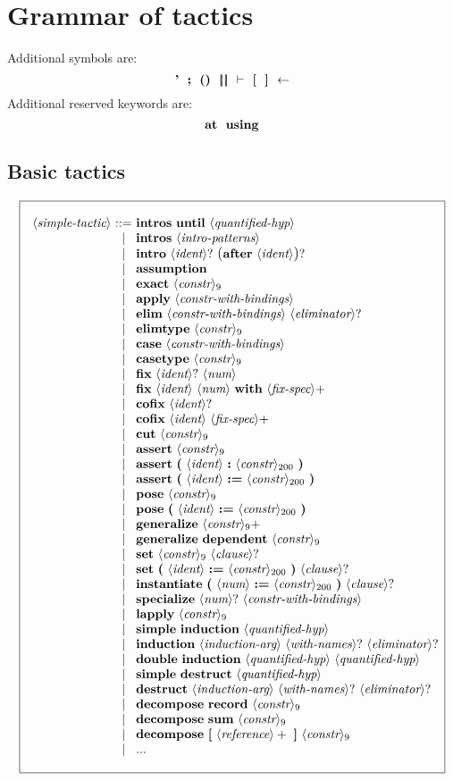 \documentclass{article}
\makeatletter
\def\bfbar{\ensuremath{|\hskip -0.22em{}|\hskip -0.24em{}|}}
\def\TERMbarbar{\bfbar\bfbar}
\def\GR#1{\text{\large(}#1\text{\large)}}
\def\NT#1{\langle\textit{#1}\rangle}
\def\NTL#1#2{\langle\textit{#1}\rangle_{#2}}
\def\TERM#1{{\bf\textrm{\bf #1}}}
\def\KWD#1{\TERM{#1}}
\def\PLUS#1{#1+}
\def\OPT#1{#1?}
\def\OPTGR#1{\GR{#1}?}
\newenvironment{cadre}
        {\begin{array}{|c|}\hline\\}
        {\\\\\hline\end{array}}
\newenvironment{rulebox}
        {$$\begin{cadre}\begin{array}{r@{~}c@{~}l@{}l@{}r}}
        {\end{array}\end{cadre}$$}
\def\DEFNT#1{\NT{#1} & ::= &}
\def\nlsep{\\&|&}
\newenvironment{rules}
        {\begin{center}\begin{rulebox}}
        {\end{rulebox}\end{center}}
\makeatother
\begin{document}

\section{Grammar of tactics}

\def\tacconstr{\NTL{constr}{9}}
\def\taclconstr{\NTL{constr}{200}}

Additional symbols are:
$$ \TERM{'}
~~ \KWD{;}
~~ \TERM{()}
~~ \TERMbarbar
~~ \TERM{$\vdash$}
~~ \TERM{[}
~~ \TERM{]}
~~ \TERM{$\leftarrow$}
$$
Additional reserved keywords are:
$$ \KWD{at}
~~ \TERM{using}
$$

\subsection{Basic tactics}

\begin{rules}
\DEFNT{simple-tactic}
       \TERM{intros}~\TERM{until}~\NT{quantified-hyp}
\nlsep \TERM{intros}~\NT{intro-patterns}
\nlsep \TERM{intro}~\OPT{\NT{ident}}~\OPTGR{\TERM{after}~\NT{ident}}
\nlsep \TERM{assumption}
\nlsep \TERM{exact}~\tacconstr
\nlsep \TERM{apply}~\NT{constr-with-bindings}
\nlsep \TERM{elim}~\NT{constr-with-bindings}~\OPT{\NT{eliminator}}
\nlsep \TERM{elimtype}~\tacconstr
\nlsep \TERM{case}~\NT{constr-with-bindings}
\nlsep \TERM{casetype}~\tacconstr
\nlsep \KWD{fix}~\OPT{\NT{ident}}~\NT{num}
\nlsep \KWD{fix}~\NT{ident}~\NT{num}~\KWD{with}~\PLUS{\NT{fix-spec}}
\nlsep \KWD{cofix}~\OPT{\NT{ident}}
\nlsep \KWD{cofix}~\NT{ident}~\PLUS{\NT{fix-spec}}
\nlsep \TERM{cut}~\tacconstr
\nlsep \TERM{assert}~\tacconstr
\nlsep \TERM{assert}~
  \TERM{(}~\NT{ident}~\KWD{:}~\taclconstr~\TERM{)}
\nlsep \TERM{assert}~
  \TERM{(}~\NT{ident}~\KWD{:=}~\taclconstr~\TERM{)}
\nlsep \TERM{pose}~\tacconstr
\nlsep \TERM{pose}~
  \TERM{(}~\NT{ident}~\KWD{:=}~\taclconstr~\TERM{)}
\nlsep \TERM{generalize}~\PLUS{\tacconstr}
\nlsep \TERM{generalize}~\TERM{dependent}~\tacconstr
\nlsep \TERM{set}~\tacconstr~\OPT{\NT{clause}}
\nlsep \TERM{set}~
  \TERM{(}~\NT{ident}~\KWD{:=}~\taclconstr~\TERM{)}~\OPT{\NT{clause}}
\nlsep \TERM{instantiate}~
  \TERM{(}~\NT{num}~\TERM{:=}~\taclconstr~\TERM{)}~\OPT{\NT{clause}}
\nlsep \TERM{specialize}~\OPT{\NT{num}}~\NT{constr-with-bindings}
\nlsep \TERM{lapply}~\tacconstr
\nlsep \TERM{simple}~\TERM{induction}~\NT{quantified-hyp}
\nlsep \TERM{induction}~\NT{induction-arg}~\OPT{\NT{with-names}}
       ~\OPT{\NT{eliminator}}
\nlsep \TERM{double}~\TERM{induction}~\NT{quantified-hyp}~\NT{quantified-hyp}
\nlsep \TERM{simple}~\TERM{destruct}~\NT{quantified-hyp}
\nlsep \TERM{destruct}~\NT{induction-arg}~\OPT{\NT{with-names}}
       ~\OPT{\NT{eliminator}}
\nlsep \TERM{decompose}~\TERM{record}~\tacconstr
\nlsep \TERM{decompose}~\TERM{sum}~\tacconstr
\nlsep \TERM{decompose}~\TERM{[}~\PLUS{\NT{reference}}~\TERM{]}
       ~\tacconstr
\nlsep ...
\end{rules}
\end{document}
